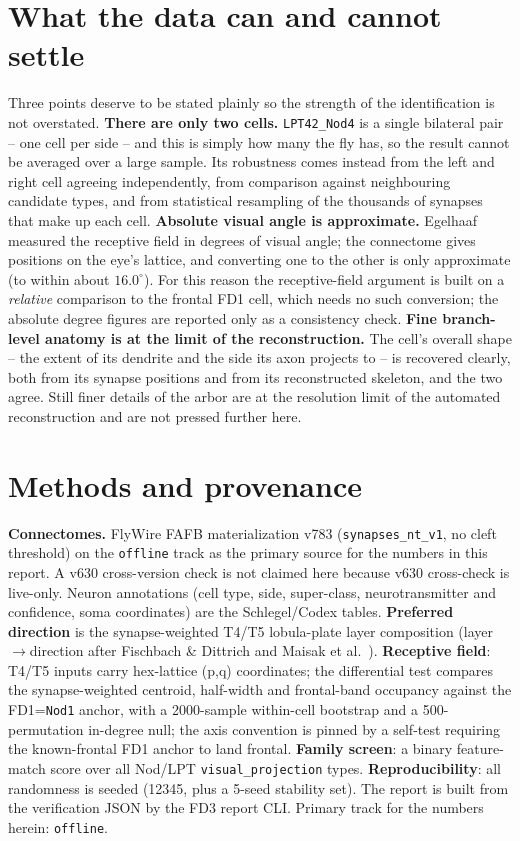 \documentclass[11pt]{article}
\newcommand{\ttt}[1]{\texttt{#1}}
\begin{document}
\section{What the data can and cannot settle}

Three points deserve to be stated plainly so the strength of the identification is not overstated. \textbf{There are only two cells.} \ttt{LPT42\_Nod4} is a single bilateral pair -- one cell per side -- and this is simply how many the fly has, so the result cannot be averaged over a large sample. Its robustness comes instead from the left and right cell agreeing independently, from comparison against neighbouring candidate types, and from statistical resampling of the thousands of synapses that make up each cell. \textbf{Absolute visual angle is approximate.} Egelhaaf measured the receptive field in degrees of visual angle; the connectome gives positions on the eye's lattice, and converting one to the other is only approximate (to within about $16.0^\circ$). For this reason the receptive-field argument is built on a \emph{relative} comparison to the frontal FD1 cell, which needs no such conversion; the absolute degree figures are reported only as a consistency check. \textbf{Fine branch-level anatomy is at the limit of the reconstruction.} The cell's overall shape -- the extent of its dendrite and the side its axon projects to -- is recovered clearly, both from its synapse positions and from its reconstructed skeleton, and the two agree. Still finer details of the arbor are at the resolution limit of the automated reconstruction and are not pressed further here.

\section{Methods and provenance}

\textbf{Connectomes.} FlyWire FAFB materialization v783 (\ttt{synapses\_nt\_v1}, no cleft threshold) on the \ttt{offline} track as the primary source for the numbers in this report. A v630 cross-version check is not claimed here because v630 cross-check is live-only. Neuron annotations (cell type, side, super-class, neurotransmitter and confidence, soma coordinates) are the Schlegel/Codex tables. \textbf{Preferred direction} is the synapse-weighted T4/T5 lobula-plate layer composition (layer$\to$direction after Fischbach \& Dittrich and Maisak et al.~\cite{fd1989,maisak2013}). \textbf{Receptive field}: T4/T5 inputs carry hex-lattice (p,q) coordinates; the differential test compares the synapse-weighted centroid, half-width and frontal-band occupancy against the FD1=\ttt{Nod1} anchor, with a 2000-sample within-cell bootstrap and a 500-permutation in-degree null; the axis convention is pinned by a self-test requiring the known-frontal FD1 anchor to land frontal. \textbf{Family screen}: a binary feature-match score over all Nod/LPT \ttt{visual\_projection} types. \textbf{Reproducibility}: all randomness is seeded (12345, plus a 5-seed stability set). The report is built from the verification JSON by the FD3 report CLI. Primary track for the numbers herein: \ttt{offline}.
\end{document}
